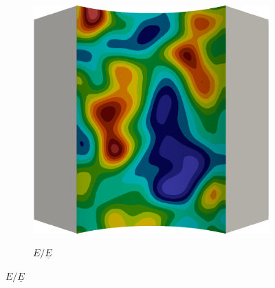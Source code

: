 \begin{figure}[!htbp]
  \centering
  \begin{subfigure}{0.25\textwidth}
    \centering
    \includegraphics[width=\textwidth]{Chapter5/figures/spallation/E.0000}
  \end{subfigure}
  \begin{subfigure}{0.1\textwidth}
    \centering
    \caption*{$E/\underline{E}$}

\end{subfigure}
\end{figure}
